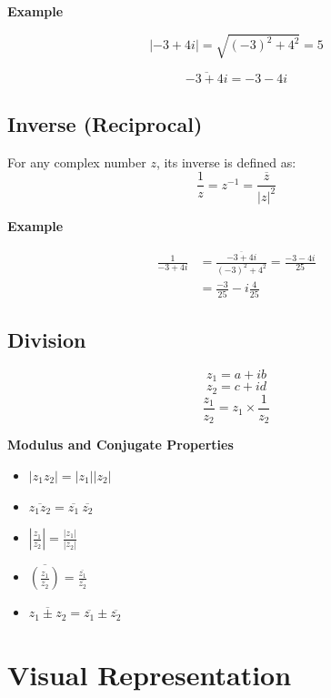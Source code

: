 \documentclass[
  14pt,
]{extarticle}
\renewenvironment{quote}{\begin{myquote}}{\end{myquote}}
\begin{document}
\begin{quote}
\textbf{Example}

\[|-3+4i|=\sqrt{(-3)^2+4^2}=5\]

\[\overline{-3+4i}=-3-4i\]
\end{quote}

\hypertarget{inverse-reciprocal}{%
\subsection{Inverse (Reciprocal)}\label{inverse-reciprocal}}

For any complex number \(z\), its inverse is defined as:
\[\frac1z=z^{-1}=\frac{\overline z}{|z|^2}\]

\begin{quote}
\textbf{Example}

\[\begin{aligned}\frac1{-3+4i}&=\frac{\overline{-3+4i}}{(-3)^2+4^2}=\frac{-3-4i}{25}\\&=\frac{-3}{25}-i\frac{4}{25}\end{aligned}\]
\end{quote}

\hypertarget{division}{%
\subsection{Division}\label{division}}

\[z_1=a+ib\] \[z_2=c+id\] \[\frac{z_1}{z_2}=z_1\times \frac1{z_2}\]

\begin{quote}
\textbf{Modulus and Conjugate Properties}

\begin{itemize}
\item
  \(|z_1z_2|=|z_1||z_2|\)
\item
  \(\overline{z_1z_2}=\overline{z_1}\ \overline{z_2}\)
\item
  \(\displaystyle\left|\frac{z_1}{z_2}\right|=\frac{|z_1|}{|z_2|}\)
\item
  \(\displaystyle\overline{\left(\frac{z_1}{z_2}\right)}=\frac{\overline{z_1}}{\overline{z_2}}\)
\item
  \(\overline{z_1\pm z_2}=\overline{z_1}\pm \overline{z_2}\)
\end{itemize}
\end{quote}

\hypertarget{visual-representation}{%
\section{Visual Representation}\label{visual-representation}}
\end{document}
